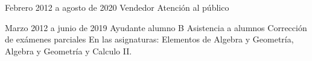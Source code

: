 \documentclass{CV_template}
\begin{document}
\begin{paracol}{2}
\begin{rightcolumn}
    {Febrero 2012 a agosto de 2020}
    {Vendedor}
    {Atención al público}
    {}{}{}{}
    
    {Marzo 2012 a junio de 2019}
    {Ayudante alumno B}
    {Asistencia a alumnos}
    {Corrección de exámenes parciales}
    {En las asignaturas: 
    Elementos de Algebra y Geometría,
     Algebra y Geometría y Calculo II.}
    {}


\end{rightcolumn}

\end{paracol}
\end{document}
